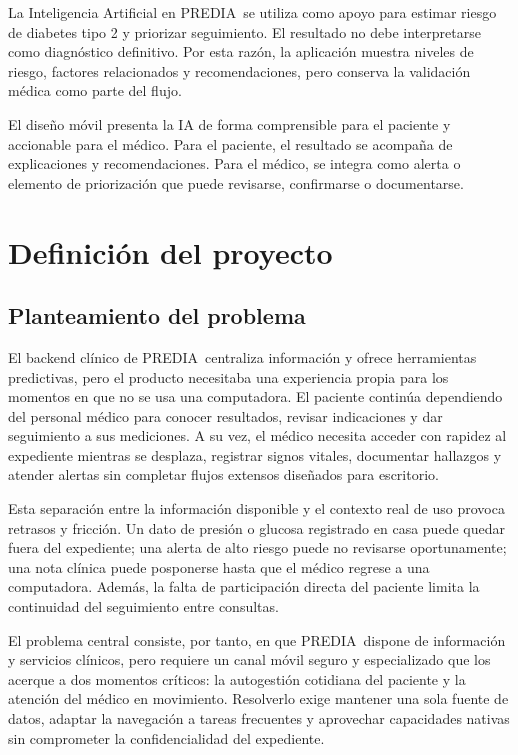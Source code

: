 \documentclass[12pt,letterpaper]{report}
\newcommand{\projectname}{PREDIA}
\begin{document}
La Inteligencia Artificial en \projectname\ se utiliza como apoyo para estimar riesgo de diabetes tipo 2 y priorizar seguimiento. El resultado no debe interpretarse como diagnóstico definitivo. Por esta razón, la aplicación muestra niveles de riesgo, factores relacionados y recomendaciones, pero conserva la validación médica como parte del flujo.

El diseño móvil presenta la IA de forma comprensible para el paciente y accionable para el médico. Para el paciente, el resultado se acompaña de explicaciones y recomendaciones. Para el médico, se integra como alerta o elemento de priorización que puede revisarse, confirmarse o documentarse.

\chapter{Definición del proyecto}

\section{Planteamiento del problema}

El backend clínico de \projectname\ centraliza información y ofrece herramientas predictivas, pero el producto necesitaba una experiencia propia para los momentos en que no se usa una computadora. El paciente continúa dependiendo del personal médico para conocer resultados, revisar indicaciones y dar seguimiento a sus mediciones. A su vez, el médico necesita acceder con rapidez al expediente mientras se desplaza, registrar signos vitales, documentar hallazgos y atender alertas sin completar flujos extensos diseñados para escritorio.

Esta separación entre la información disponible y el contexto real de uso provoca retrasos y fricción. Un dato de presión o glucosa registrado en casa puede quedar fuera del expediente; una alerta de alto riesgo puede no revisarse oportunamente; una nota clínica puede posponerse hasta que el médico regrese a una computadora. Además, la falta de participación directa del paciente limita la continuidad del seguimiento entre consultas.

El problema central consiste, por tanto, en que \projectname\ dispone de información y servicios clínicos, pero requiere un canal móvil seguro y especializado que los acerque a dos momentos críticos: la autogestión cotidiana del paciente y la atención del médico en movimiento. Resolverlo exige mantener una sola fuente de datos, adaptar la navegación a tareas frecuentes y aprovechar capacidades nativas sin comprometer la confidencialidad del expediente.
\end{document}
